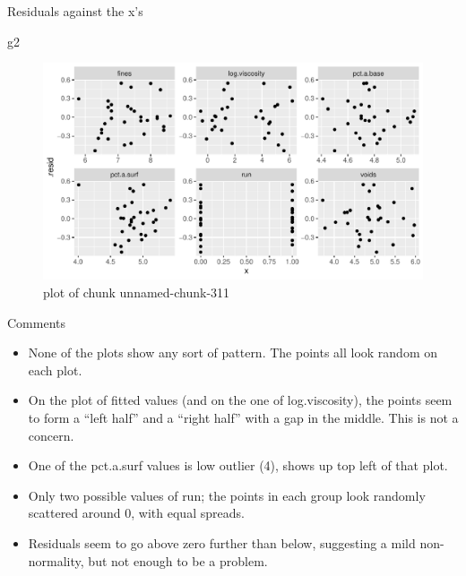 \documentclass[
  ignorenonframetext,
]{beamer}
\newenvironment{Shaded}{\begin{snugshade}}{\end{snugshade}}
\newcommand{\NormalTok}[1]{#1}
\providecommand{\tightlist}{%
  \setlength{\itemsep}{0pt}\setlength{\parskip}{0pt}}
\begin{document}
\begin{frame}[fragile]{Residuals against the x's}
\protect\hypertarget{residuals-against-the-xs}{}

\begin{Shaded}
\begin{Highlighting}[]
\NormalTok{g2}
\end{Highlighting}
\end{Shaded}

\begin{figure}
\centering
\includegraphics{figure/unnamed-chunk-311-1.pdf}
\caption{plot of chunk unnamed-chunk-311}
\end{figure}

\end{frame}

\begin{frame}{Comments}
\protect\hypertarget{comments-24}{}

\begin{itemize}
\tightlist
\item
  None of the plots show any sort of pattern. The points all look random
  on each plot.
\item
  On the plot of fitted values (and on the one of log.viscosity), the
  points seem to form a ``left half'' and a ``right half'' with a gap in
  the middle. This is not a concern.
\item
  One of the pct.a.surf values is low outlier (4), shows up top left of
  that plot.
\item
  Only two possible values of run; the points in each group look
  randomly scattered around 0, with equal spreads.
\item
  Residuals seem to go above zero further than below, suggesting a mild
  non-normality, but not enough to be a problem.
\end{itemize}

\end{frame}
\end{document}
